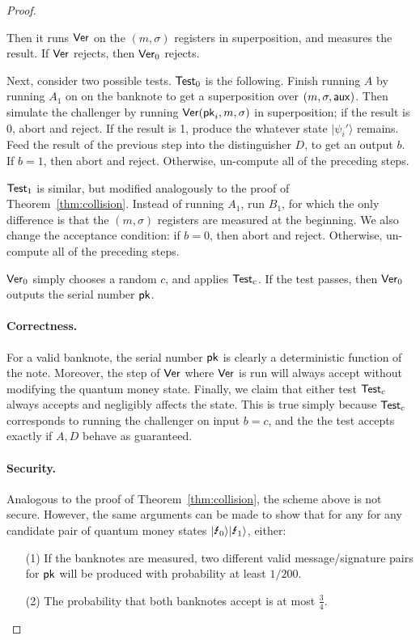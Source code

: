 \begin{proof}
\begin{itemize}
	Then it runs ${\sf Ver}$ on the $(m,\sigma)$ registers in superposition, and measures the result.  If ${\sf Ver}$ rejects, then ${\sf Ver}_0$ rejects.
	
	Next, consider two possible tests.  ${\sf Test}_0$ is the following.  Finish running $A$ by running $A_1$ on on the banknote to get a superposition over $(m,\sigma,{\sf aux})$.  Then simulate the challenger by running ${\sf Ver}({\sf pk}_i,m,\sigma)$ in superposition; if the result is $0$, abort and reject.  If the result is 1, produce the whatever state $|\psi_i'\rangle$ remains.  Feed the result of the previous step into the distinguisher $D$, to get an output $b$. If $b=1$, then abort and reject.  Otherwise, un-compute all of the preceding steps. 
	
	${\sf Test}_1$ is similar, but modified analogously to the proof of Theorem~\ref{thm:collision}.  Instead of running $A_1$, run $B_1$, for which the only difference is that the $(m,\sigma)$ registers are measured at the beginning.  We also change the acceptance condition: if $b=0$, then abort and reject.  Otherwise, un-compute all of the preceding steps. 
	
	${\sf Ver}_0$ simply chooses a random $c$, and applies ${\sf Test}_c$.  If the test passes, then ${\sf Ver}_0$ outputs the serial number ${\sf pk}$.
\end{itemize}

\paragraph{Correctness.} For a valid banknote, the serial number ${\sf pk}$ is clearly a deterministic function of the note.  Moreover, the step of ${\sf Ver}$ where ${\sf Ver}$ is run will always accept without modifying the quantum money state.  Finally, we claim that either test ${\sf Test}_c$ always accepts and negligibly affects the state.  This is true simply because ${\sf Test}_c$ corresponds to running the challenger on input $b=c$, and the the test accepts exactly if $A,D$ behave as guaranteed.

\paragraph{Security.} Analogous to the proof of Theorem~\ref{thm:collision}, the scheme above is not secure.  However, the same arguments can be made to show that for any for any candidate pair of quantum money states $\qlightning[0]\qlightning[1]$, either:
\begin{itemize}
	\item[(1)] If the banknotes are measured, two different valid message/signature pairs for ${\sf pk}$ will be produced with probability at least $1/200$.
	\item[(2)] The probability that both banknotes accept is at most $\frac{3}{4}$.  
\end{itemize}


\end{proof}
